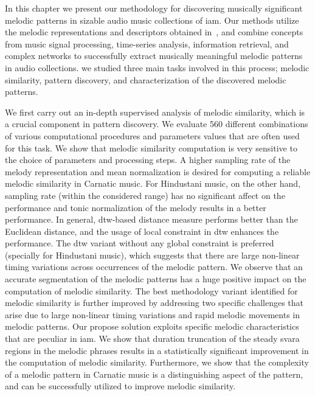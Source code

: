 {In this chapter we present our methodology for discovering musically significant melodic patterns in sizable audio music collections of \gls{iam}. Our methods utilize the  melodic representations and descriptors obtained in~, and combine concepts from music signal processing, time-series analysis, information retrieval, and complex networks to successfully extract musically meaningful melodic patterns in audio collections. we studied three main tasks involved in this process; melodic similarity, pattern discovery, and characterization of the discovered melodic patterns. 

We first carry out an in-depth supervised analysis of melodic similarity, which is a crucial component in pattern discovery. We evaluate 560 different combinations of various computational procedures and parameters values that are often used for this task. We show that melodic similarity computation is very sensitive to the choice of parameters and processing steps. A higher sampling rate of the melody representation and mean normalization is desired for computing a reliable melodic similarity in Carnatic music. For Hindustani music, on the other hand, sampling rate (within the considered range) has no significant affect on the performance and tonic normalization of the melody results in a better performance. In general, \gls{dtw}-based distance measure performs better than the Euclidean distance, and the usage of local constraint in \gls{dtw} enhances the performance. The \gls{dtw} variant without any global constraint is preferred (specially for Hindustani music), which suggests that there are large non-linear timing variations across occurrences of the melodic pattern. We observe that an accurate segmentation of the melodic patterns has a huge positive impact on the computation of melodic similarity. The best methodology variant identified for melodic similarity is further improved by addressing two specific challenges that arise due to large non-linear timing variations and rapid melodic movements in melodic patterns. Our propose solution exploits specific melodic characteristics that are peculiar in \gls{iam}. We show that duration truncation of the steady \gls{svara} regions in the melodic phrases results in a statistically significant improvement in the computation of melodic similarity. Furthermore, we show that the complexity of a melodic pattern in Carnatic music is a distinguishing aspect of the pattern, and can be successfully utilized to improve melodic similarity.

}
